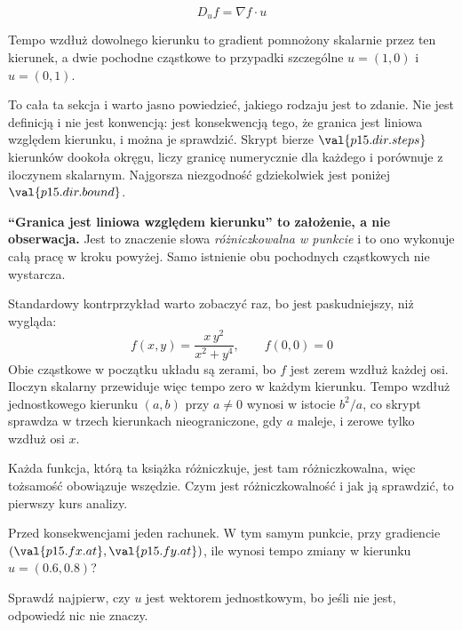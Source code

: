 \begin{fr}
\begin{ansblock}
\[ D_u f = \nabla f \cdot u \]
\end{ansblock}

Tempo wzdłuż dowolnego kierunku to gradient pomnożony skalarnie przez ten
kierunek, a dwie pochodne cząstkowe to przypadki szczególne $u = (1,0)$ i
$u = (0,1)$.

To cała ta sekcja i warto jasno powiedzieć, jakiego rodzaju jest to zdanie.
Nie jest definicją i nie jest konwencją: jest konsekwencją tego, że granica
jest liniowa względem kierunku, i można je sprawdzić. Skrypt bierze
$\val{p15.dir.steps}$ kierunków dookoła okręgu, liczy granicę numerycznie dla
każdego i porównuje z iloczynem skalarnym. Najgorsza niezgodność gdziekolwiek
jest poniżej $\val{p15.dir.bound}$.

\begin{rigourbox}
\textbf{\enquote{Granica jest liniowa względem kierunku} to założenie, a nie
obserwacja.} Jest to znaczenie słowa \emph{różniczkowalna w punkcie} i to ono
wykonuje całą pracę w kroku powyżej. Samo istnienie obu pochodnych cząstkowych
nie wystarcza.

Standardowy kontrprzykład warto zobaczyć raz, bo jest paskudniejszy, niż
wygląda:
\[ f(x, y) = \frac{x\,y^{2}}{x^{2} + y^{4}}, \qquad f(0, 0) = 0 \]
Obie cząstkowe w początku układu są zerami, bo $f$ jest zerem wzdłuż każdej
osi. Iloczyn skalarny przewiduje więc tempo zero w każdym kierunku. Tempo
wzdłuż jednostkowego kierunku $(a, b)$ przy $a \neq 0$ wynosi w istocie
$b^{2}/a$, co skrypt sprawdza w trzech kierunkach \dash{} nieograniczone, gdy
$a$ maleje, i zerowe tylko wzdłuż osi $x$.

Każda funkcja, którą ta książka różniczkuje, jest tam różniczkowalna, więc
tożsamość obowiązuje wszędzie. Czym jest różniczkowalność i jak ją sprawdzić,
to pierwszy kurs analizy.
\end{rigourbox}


\end{fr}

\begin{fr}
Przed konsekwencjami jeden rachunek. W tym samym punkcie, przy gradiencie
$(\val{p15.fx.at}, \val{p15.fy.at})$, ile wynosi tempo zmiany w kierunku
$u = (\num{0.6}, \num{0.8})$?

Sprawdź najpierw, czy $u$ jest wektorem jednostkowym, bo jeśli nie jest,
odpowiedź nic nie znaczy.
\dotline
\nextframe
\end{fr}

